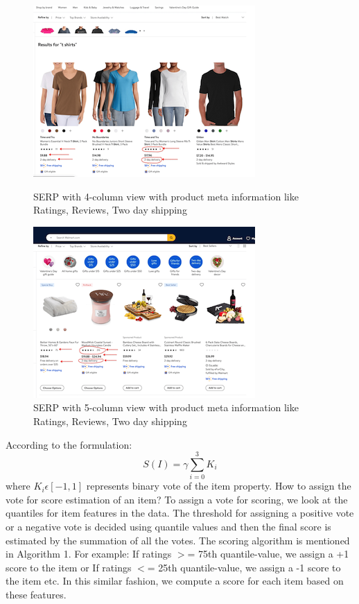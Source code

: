 \documentclass[11pt]{article}
\begin{document}
\begin{figure}[t!]
\vspace{-38mm}
   \centering
   \includegraphics[bb = 0 0 240 185]{submissions/debaising_grid_search/figs/4-col-min.png}
   \caption{SERP with 4-column view with product meta information like Ratings, Reviews, Two day shipping}
\vspace{-13mm}
  \includegraphics[bb = 0 0 240 185]{submissions/debaising_grid_search/figs/5-col-min.png}
   \caption{SERP with 5-column view with product meta information like Ratings, Reviews, Two day shipping}
\end{figure}
According to the formulation: 
\begin{equation}
S(I) = \gamma\sum_{i=0}^3 K_i 
\end{equation}
where $K_i \epsilon [-1,1]$ represents binary vote of the item property. 
\newline How to assign the vote for score estimation of an item? To assign a vote for scoring, we look at the quantiles for item features in the data. The threshold for assigning a positive vote or a negative vote is decided using quantile values and then the final score is estimated by the summation of all the votes. The scoring algorithm is mentioned in Algorithm 1.
\newline For example: 
\newline If ratings $>$= 75th quantile-value, we assign a +1 score to the item or
If ratings $<$= 25th quantile-value, we assign a -1 score to the item etc. 
In this similar fashion, we compute a score for each item based on these features. 
\end{document}
